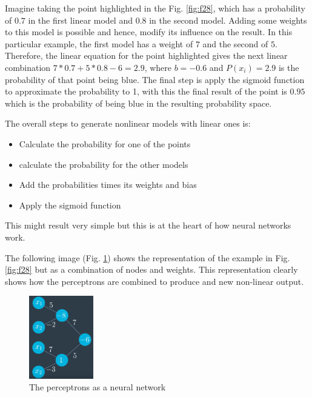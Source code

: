 \documentclass{article}
\begin{document}
Imagine taking the point highlighted in the Fig. \ref{fig:f28}, which has a probability of \(0.7\) in the first linear model and \(0.8\) in the second model. Adding some weights to this model is possible and hence, modify its influence on the result. In this particular example, the first model has a weight of \(7\) and the second of \(5\). Therefore, the linear equation for the point highlighted gives the next linear combination \(7*0.7 + 5*0.8 - 6 = 2.9\), where \(b = -0.6\) and \(P(x_i) = 2.9\) is the probability of that point being blue. The final step is apply the sigmoid function to approximate the probability to 1, with this the final result of the point is \(0.95\) which is the probability of being blue in the resulting probability space. 

The overall steps to generate nonlinear models with linear ones is:

\begin{itemize}
  \item Calculate the probability for one of the points
  \item calculate the probability for the other models
  \item Add the probabilities times its weights and bias
  \item Apply the sigmoid function
\end{itemize}

This might result very simple but this is at the heart of how neural networks work.

The following image (Fig. \ref{fig:f29}) shows the representation of the example in Fig. \ref{fig:f28} but as a combination of nodes and weights. This representation clearly shows how the perceptrons are combined to produce and new non-linear output.

\begin{figure}[ht]
    \centering
    \includegraphics[width=0.25\textwidth,height=0.25\textheight,keepaspectratio]{images/adding_perceptrons_2.png}
    \captionsetup{justification=centering}
    \caption{The perceptrons as a neural network}
    \label{fig:f29}
\end{figure}
\end{document}

